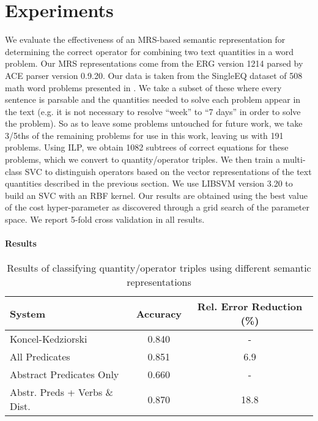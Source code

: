 \section{Experiments}

We evaluate the effectiveness of an MRS-based semantic representation for determining the correct operator for combining two text quantities in a word problem. 
Our MRS representations come from the ERG version 1214 parsed by ACE parser version 0.9.20.
Our data is taken from the {\sc SingleEQ} dataset of 508 math word problems presented in \cite{koncel2015parsing}.
We take a subset of these where every sentence is parsable and the quantities needed to solve each problem appear in the text (e.g. it is not necessary to resolve ``week'' to ``7 days'' in order to solve the problem). 
So as to leave some problems untouched for future work, we take 3/5ths of the remaining problems for use in this work, leaving us with 191 problems.
Using ILP, we obtain 1082 subtrees of correct equations for these problems, which we convert to quantity/operator triples. 
We then train a multi-class SVC to distinguish operators based on the vector representations of the text quantities described in the previous section.  
We use LIBSVM version 3.20 \cite{CC01a} to build an SVC with an RBF kernel. 
Our results are obtained using the best value of the cost hyper-parameter as discovered through a grid search of the parameter space.
We report 5-fold cross validation in all results. 

\paragraph{Results}

\begin{table*}[t]
 \begin{center}
\begin{small}
\begin{tabular}{|lcc|}
\hline 
\small System & Accuracy & Rel. Error Reduction (\%)\\ \hline
\small Koncel-Kedziorski & 0.840 & -  \\
\small All Predicates & 0.851 & 6.9 \\
\small Abstract Predicates Only& 0.660 & - \\
\small Abstr. Preds + Verbs \& Dist. & 0.870 & 18.8 \\
\hline
\end{tabular}
\end{small}
\caption{Results of classifying quantity/operator triples using different semantic representations}
\label{tab:res}
\end{center}
\end{table*}

